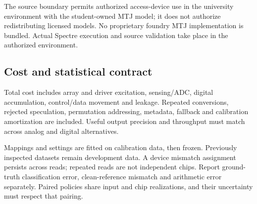 The source boundary permits authorized access-device use in the university environment
with the student-owned MTJ model; it does not authorize redistributing licensed models.
No proprietary foundry MTJ implementation is bundled. Actual Spectre execution and
source validation take place in the authorized environment.

\subsection{Cost and statistical contract}

Total cost includes array and driver excitation, sensing/ADC, digital accumulation,
control/data movement and leakage. Repeated conversions, rejected speculation,
permutation addressing, metadata, fallback and calibration amortization are included.
Useful output precision and throughput must match across analog and digital alternatives.

Mappings and settings are fitted on calibration data, then frozen. Previously inspected
datasets remain development data. A device mismatch assignment persists across reads;
repeated reads are not independent chips. Report ground-truth classification error,
clean-reference mismatch and arithmetic error separately. Paired policies share input
and chip realizations, and their uncertainty must respect that pairing.
